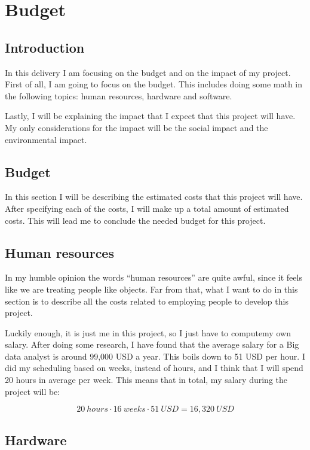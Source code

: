 
\section{Budget}

\subsection{Introduction}

In this delivery I am focusing on the budget and on the impact of my project.
First of all, I am going to focus on the budget. This includes doing some math
in the following topics: human resources, hardware and software.

Lastly, I will be explaining the impact that I expect that this project will
have. My only considerations for the impact will be the social impact and the
environmental impact.

\subsection{Budget}

In this section I will be describing the estimated costs that this project will
have. After specifying each of the costs, I will make up a total amount of
estimated costs. This will lead me to conclude the needed budget for this
project.

\subsection{Human resources}

In my humble opinion the words ``human resources'' are quite awful, since it
feels like we are treating people like objects. Far from that, what I want to
do in this section is to describe all the costs related to employing people to
develop this project.

Luckily enough, it is just me in this project, so I just have to computemy own
salary. After doing some research, I have found that the average salary for a
Big data analyst is around 99,000 USD a year. This boils down to 51 USD per
hour. I did my scheduling based on weeks, instead of hours, and I think that I
will spend 20 hours in average per week. This means that in total, my salary
during the project will be:

\[
  20\ hours \cdot 16\ weeks \cdot 51\ USD = 16,320\ USD
\]


\subsection{Hardware}

